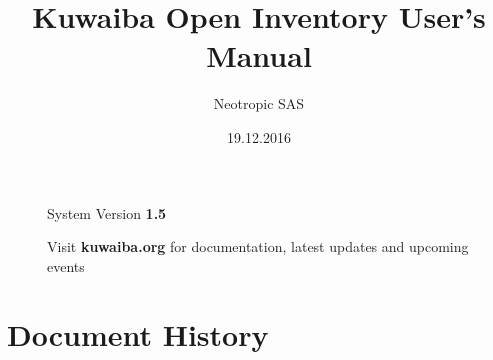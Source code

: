\documentclass[a4paper]{article}
\title{Kuwaiba Open Inventory User's Manual}
\author{Neotropic SAS}
\date{19.12.2016}
\begin{document}
	\maketitle
	
	
	
	\begin{figure}[b]
		\centering System Version \textbf{1.5}
			
		Visit \textbf{kuwaiba.org} for documentation, latest updates and upcoming events
	\end{figure}
	
	
	\newpage
	
	\tableofcontents

	\newpage
	\section{Document History}
\end{document}
